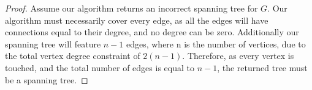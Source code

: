\documentclass{article}
\begin{document}
\begin{proof}
Assume our algorithm returns an incorrect spanning tree for $G$. Our algorithm must necessarily cover every edge, as all the edges will have connections equal to their degree, and no degree can be zero. Additionally our spanning tree will feature $n-1$ edges, where n is the number of vertices, due to the total vertex degree constraint of $2(n-1)$. Therefore, as every vertex is touched, and the total number of edges is equal to $n-1$, the returned tree must be a spanning tree.
\end{proof}
\end{document}
